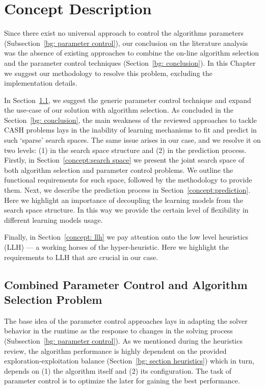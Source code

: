 \chapter{Concept Description}


Since there exist no universal approach to control the algorithms parameters (Subsection~\ref{bg: parameter control}), our conclusion on the literature analysis was the absence of existing approaches to combine the on-line algorithm selection and the parameter control techniques (Section~\ref{bg: conclusion}). In this Chapter we suggest our methodology to resolve this problem, excluding the implementation details.

In Section~\ref{concept:parameter control}, we suggest the generic parameter control technique and expand the use-case of our solution with algorithm selection. As concluded in the Section~\ref{bg: conclusion}, the main weakness of the reviewed approaches to tackle CASH problems lays in the inability of learning mechanisms to fit and predict in such `sparse' search spaces. The same issue arises in our case, and we resolve it on two levels: (1) in the search space structure and (2) in the prediction process. Firstly, in Section~\ref{concept:search space} we present the joint search space of both algorithm selection and parameter control problems. We outline the functional requirements for such space, followed by the methodology to provide them. Next, we describe the prediction process in Section~\ref{concept:prediction}. Here we highlight an importance of decoupling the learning models from the search space structure. In this way we provide the certain level of flexibility in different learning models usage.

Finally, in Section~\ref{concept: llh} we pay attention onto the low level heuristics (LLH) — a working horses of the hyper-heuristic. Here we highlight the requirements to LLH that are crucial in our case.


\section{Combined Parameter Control and Algorithm Selection Problem}\label{concept:parameter control}
The base idea of the parameter control approaches lays in adapting the solver behavior in the runtime as the response to changes in the solving process (Subsection~\ref{bg: parameter control}). As we mentioned during the heuristics review, the algorithm performance is highly dependent on the provided exploration-exploitation balance (Section~\ref{bg: section heuristics}) which in turn, depends on (1) the algorithm itself and (2) its configuration. The task of parameter control is to optimize the later for gaining the best performance. 

